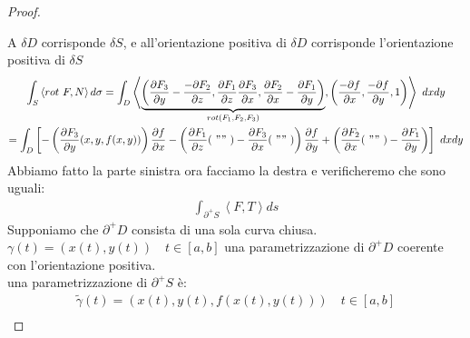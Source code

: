 \documentclass[a4paper, oneside]{article}
\begin{document}
\begin{proof}
\begin{center}
   \end{center}
   A $\delta D$ corrisponde $\delta S$, e all'orientazione positiva di $\delta D$ corrisponde l'orientazione positiva di $\delta S$\\
   \begin{gather*}
    \int_S \left\langle rot \ F , N \right\rangle d\sigma = \int_D \left\langle \underbrace{\left( \frac{\partial F_3}{\partial y} - \frac{-\partial F_2}{\partial z} , \frac{\partial F_1}{\partial z} \frac{\partial F_3}{\partial x} , \frac{\partial F_2}{\partial x} - \frac{\partial F_1}{\partial y} \right)}_{rot(F_1, F_2, F_3)} , \left( \frac{-\partial f}{\partial x}, \frac{-\partial f}{\partial y} , 1 \right) \right\rangle  \ dxdy\\
    = \int_D \left[ -\left(\frac{\partial F_3}{\partial y}(x,y,f(x,y))\right) \frac{\partial f}{\partial x}  - \left(\frac{\partial F_1}{\partial z}( \ "" \ )- \frac{\partial F_3}{\partial x} ( \ "" \ )\right)\frac{\partial f}{\partial y} + \left(\frac{\partial F_2}{\partial x}( \ "" \ )-\frac{\partial F_1}{\partial y}\right)  \right] \ dxdy 
   \end{gather*}
   Abbiamo fatto la parte sinistra ora facciamo la destra e verificheremo che sono uguali:
   \begin{gather*}
    \int_{\partial^+ S} \left\langle F, T \right\rangle ds
   \end{gather*}
   Supponiamo che $\partial^+ D$ consista di una sola curva chiusa.\\
    $\gamma(t) = (x(t), y(t)) \quad t \in [a,b]$ una parametrizzazione di $\partial^+ D$  coerente con l'orientazione positiva.\\
    una parametrizzazione di $\partial^+ S$ è:
   \begin{gather*}
    \widetilde{\gamma}(t) = (x(t), y(t), f(x(t), y(t))) \quad t \in [a,b]\\

\end{gather*}
\end{proof}
\end{document}
